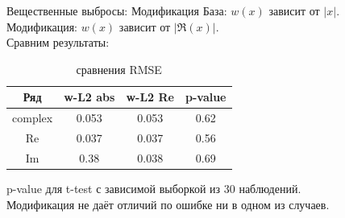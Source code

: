 \documentclass[ucs, notheorems, handout]{beamer}
\begin{document}
\begin{frame}{Вещественные выбросы: Модификация}
    \alert{База:} $w(x)$ зависит от $|x|$.\\
    \alert{Модификация:} $w(x)$ зависит от $|\Re(x)|$.\\
    \vspace{1em}
    Сравним результаты:
    \begin{table}[H]
	\begin{center}
		\caption{сравнения RMSE}
		\label{tab3}
		\begin{tabular}{|c|c|c|c|}
			\hline
			Ряд & w-L2 abs & w-L2 Re & p-value \\ 
			\hline
			complex & 0.053  & 0.053 & 0.62 \\
			\hline
			Re & 0.037  & 0.037 & 0.56 \\
			\hline
			Im & 0.38  & 0.038 & 0.69 \\
			\hline
		\end{tabular}
	\end{center}
    \end{table}
    p-value для t-test с зависимой выборкой из $30$ наблюдений.\\
    \vspace{1em}
    Модификация не даёт отличий по ошибке ни в одном из случаев.
\end{frame}
\end{document}
